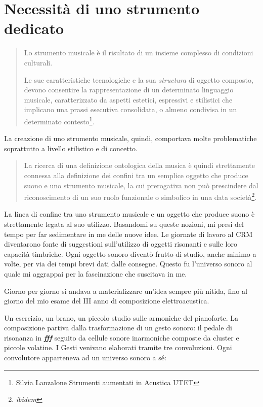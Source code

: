 \section{Necessità di uno strumento dedicato}

\begin{small}
\begin{quotation}
Lo strumento musicale è il risultato di un insieme complesso di condizioni culturali.

Le sue caratteristiche tecnologiche e la sua \textit{structura} di oggetto composto, devono consentire la rappresentazione di un determinato linguaggio musicale, caratterizzato da aspetti estetici, espressivi e stilistici che implicano una prassi esecutiva consolidata, o almeno condivisa in un determinato contesto\footnote{Silvia Lanzalone Strumenti aumentati in Acustica UTET}.
\end{quotation}
\end{small}

La creazione di uno strumento musicale, quindi, comportava molte problematiche soprattutto a livello stilistico e di concetto. 

\begin{small}
\begin{quotation}
La ricerca di una definizione ontologica della musica è quindi strettamente connessa alla definizione dei confini tra un semplice oggetto che produce suono e uno strumento musicale, la cui prerogativa non può prescindere dal riconoscimento di un suo ruolo funzionale o simbolico in una data società\footnote{\textit{ibidem}}.
\end{quotation}
\end{small}

La linea di confine tra uno strumento musicale e un oggetto che produce suono è strettamente legata al suo utilizzo. Basandomi su queste nozioni, mi presi del tempo per far sedimentare in me delle nuove idee. Le giornate di lavoro al CRM diventarono fonte di suggestioni sull'utilizzo di oggetti risonanti e sulle loro capacità timbriche. Ogni oggetto sonoro diventò frutto di studio, anche minimo a volte, per via dei tempi brevi dati dalle consegne. Questo fu l'universo sonoro al quale mi aggrappai per la fascinazione che suscitava in me.

Giorno per giorno si andava a materializzare un'idea sempre più nitida, fino al giorno del mio esame del III anno di composizione elettroacustica.

Un esercizio, un brano, un piccolo studio sulle armoniche del pianoforte. La composizione partiva dalla trasformazione di un gesto sonoro: il pedale di risonanza in \textit{\textbf{fff}} seguito da cellule sonore inarmoniche composte da cluster e piccole volatine. I Gesti venivano elaborati tramite tre convoluzioni. Ogni convolutore apparteneva ad un universo sonoro a sé:

